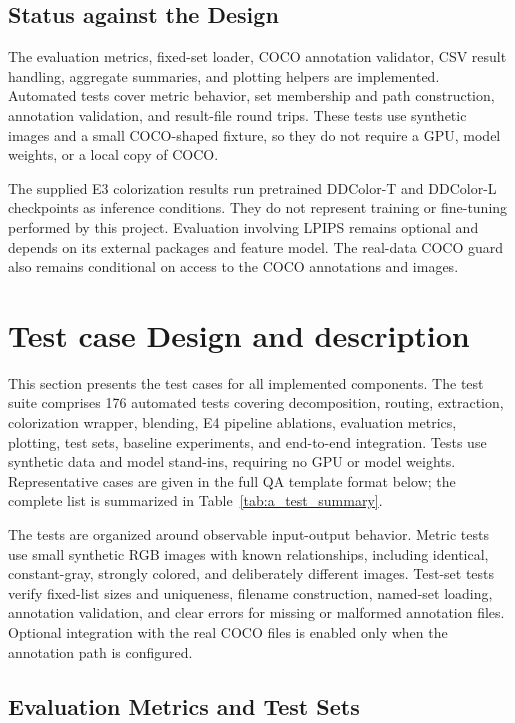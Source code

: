 \documentclass{FastFyp}
\begin{document}
\subsection{Status against the Design}
\label{status}

The evaluation metrics, fixed-set loader, COCO annotation validator, CSV
result handling, aggregate summaries, and plotting helpers are implemented.
Automated tests cover metric behavior, set membership and path construction,
annotation validation, and result-file round trips. These tests use synthetic
images and a small COCO-shaped fixture, so they do not require a GPU, model
weights, or a local copy of COCO.

The supplied E3 colorization results run pretrained DDColor-T and DDColor-L
checkpoints as inference conditions. They do not represent training or
fine-tuning performed by this project. Evaluation involving LPIPS remains
optional and depends on its external packages and feature model. The real-data
COCO guard also remains conditional on access to the COCO annotations and
images.
\section{Test case Design and description}
This section presents the test cases for all implemented components. The test suite comprises 176 automated tests covering decomposition, routing, extraction, colorization wrapper, blending, E4 pipeline ablations, evaluation metrics, plotting, test sets, baseline experiments, and end-to-end integration. Tests use synthetic data and model stand-ins, requiring no GPU or model weights. Representative cases are given in the full QA template format below; the complete list is summarized in Table~\ref{tab:a_test_summary}.

The tests are organized around observable input-output behavior. Metric tests
use small synthetic RGB images with known relationships, including identical,
constant-gray, strongly colored, and deliberately different images. Test-set
tests verify fixed-list sizes and uniqueness, filename construction, named-set
loading, annotation validation, and clear errors for missing or malformed
annotation files. Optional integration with the real COCO files is enabled
only when the annotation path is configured.

\subsection{Evaluation Metrics and Test Sets}
\label{subsubsec:person-c-test-cases}
\end{document}
